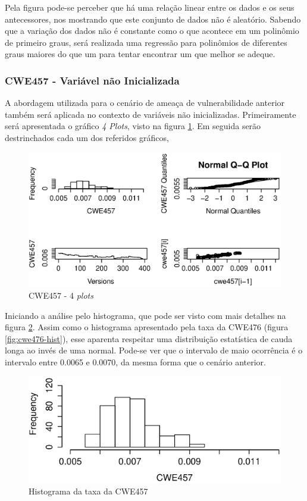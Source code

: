 Pela figura pode-se perceber que há uma relação linear entre os dados e os seus
antecessores, nos mostrando que este conjunto de dados não é aleatório. Sabendo
que a variação dos dados não é constante como o que acontece em um polinômio de
primeiro graus, será realizada uma regressão para polinômios de diferentes graus
maiores do que um para tentar encontrar um que melhor se adeque.


\subsubsection{CWE457 - Variável não Inicializada}\label{eda:cwe457}

A abordagem utilizada para o cenário de ameaça de vulnerabilidade anterior
também será aplicada no contexto de variáveis não inicializadas. Primeiramente
será apresentada o gráfico \textit{4 Plots}, visto na figura
\ref{fig:cwe457-4-plot}. Em seguida serão destrinchados cada um dos referidos
gráficos,

\begin{figure}[h]
  \centering
  \includegraphics[width=1.0\textwidth]
      {figuras/cwe457-4-plot.eps}
      \caption{CWE457 - 4 \textit{plots}}
  \label{fig:cwe457-4-plot}
\end{figure}

Iniciando a análise pelo histograma, que pode ser visto com mais detalhes na
figura \ref{fig:cwe457-hist}. Assim como o histograma apresentado pela taxa da
CWE476 (figura \ref{fig:cwe476-hist}), esse aparenta respeitar uma distribuição
estatística de cauda longa ao invés de uma normal. Pode-se ver que o intervalo
de maio ocorrência é o intervalo entre 0.0065 e 0.0070, da mesma forma que o
cenário anterior.

\begin{figure}[h]
  \centering
  \includegraphics[width=1.0\textwidth]
      {figuras/cwe457-hist.eps}
      \caption{Histograma da taxa da CWE457}
  \label{fig:cwe457-hist}
\end{figure}

